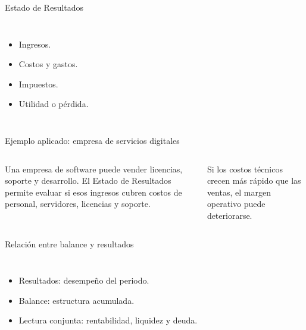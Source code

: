 \begin{frame}{Estado de Resultados}
  \begin{columns}[T,onlytextwidth]
    \begin{itemize}
      \item Ingresos.
      \item Costos y gastos.
      \item Impuestos.
      \item Utilidad o pérdida.
    \end{itemize}
  \end{columns}
\end{frame}

\begin{frame}{Ejemplo aplicado: empresa de servicios digitales}
  \begin{columns}[T,onlytextwidth]
    \footnotesize
    Una empresa de software puede vender licencias, soporte y desarrollo. El Estado de Resultados permite evaluar si esos ingresos cubren costos de personal, servidores, licencias y soporte.

    \vspace{0.5em}
    Si los costos técnicos crecen más rápido que las ventas, el margen operativo puede deteriorarse.
  \end{columns}
\end{frame}

\begin{frame}{Relación entre balance y resultados}
  \begin{columns}[T,onlytextwidth]
    \begin{itemize}
      \item Resultados: desempeño del periodo.
      \item Balance: estructura acumulada.
      \item Lectura conjunta: rentabilidad, liquidez y deuda.
    \end{itemize}
  \end{columns}
\end{frame}

